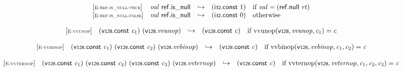 \vspace{1ex}

$$
\begin{array}{@{}l@{}lcl@{}l@{}}
{[\textsc{\scriptsize E{-}ref.is\_null{-}true}]} \quad & {\mathit{val}}~\mathsf{ref.is\_null} &\hookrightarrow& (\mathsf{i{\scriptstyle32}}.\mathsf{const}~1) &\quad
  \mbox{if}~{\mathit{val}} = (\mathsf{ref.null}~{\mathit{rt}}) \\
{[\textsc{\scriptsize E{-}ref.is\_null{-}false}]} \quad & {\mathit{val}}~\mathsf{ref.is\_null} &\hookrightarrow& (\mathsf{i{\scriptstyle32}}.\mathsf{const}~0) &\quad
  \mbox{otherwise} \\
\end{array}
$$

\vspace{1ex}

$$
\begin{array}{@{}l@{}lcl@{}l@{}}
{[\textsc{\scriptsize E{-}vvunop}]} \quad & (\mathsf{v{\scriptstyle128}}.\mathsf{const}~{\mathit{c}}_{{1}})~(\mathsf{v{\scriptstyle128}} . {\mathit{vvunop}}) &\hookrightarrow& (\mathsf{v{\scriptstyle128}}.\mathsf{const}~{\mathit{c}}) &\quad
  \mbox{if}~{\mathrm{vvunop}}(\mathsf{v{\scriptstyle128}}, {\mathit{vvunop}}, {\mathit{c}}_{{1}}) = {\mathit{c}} \\
\end{array}
$$

\vspace{1ex}

$$
\begin{array}{@{}l@{}lcl@{}l@{}}
{[\textsc{\scriptsize E{-}vvbinop}]} \quad & (\mathsf{v{\scriptstyle128}}.\mathsf{const}~{\mathit{c}}_{{1}})~(\mathsf{v{\scriptstyle128}}.\mathsf{const}~{\mathit{c}}_{{2}})~(\mathsf{v{\scriptstyle128}} . {\mathit{vvbinop}}) &\hookrightarrow& (\mathsf{v{\scriptstyle128}}.\mathsf{const}~{\mathit{c}}) &\quad
  \mbox{if}~{\mathrm{vvbinop}}(\mathsf{v{\scriptstyle128}}, {\mathit{vvbinop}}, {\mathit{c}}_{{1}}, {\mathit{c}}_{{2}}) = {\mathit{c}} \\
\end{array}
$$

\vspace{1ex}

$$
\begin{array}{@{}l@{}lcl@{}l@{}}
{[\textsc{\scriptsize E{-}vvternop}]} \quad & (\mathsf{v{\scriptstyle128}}.\mathsf{const}~{\mathit{c}}_{{1}})~(\mathsf{v{\scriptstyle128}}.\mathsf{const}~{\mathit{c}}_{{2}})~(\mathsf{v{\scriptstyle128}}.\mathsf{const}~{\mathit{c}}_{{3}})~(\mathsf{v{\scriptstyle128}} . {\mathit{vvternop}}) &\hookrightarrow& (\mathsf{v{\scriptstyle128}}.\mathsf{const}~{\mathit{c}}) &\quad
  \mbox{if}~{\mathrm{vvternop}}(\mathsf{v{\scriptstyle128}}, {\mathit{vvternop}}, {\mathit{c}}_{{1}}, {\mathit{c}}_{{2}}, {\mathit{c}}_{{3}}) = {\mathit{c}} \\
\end{array}
$$

